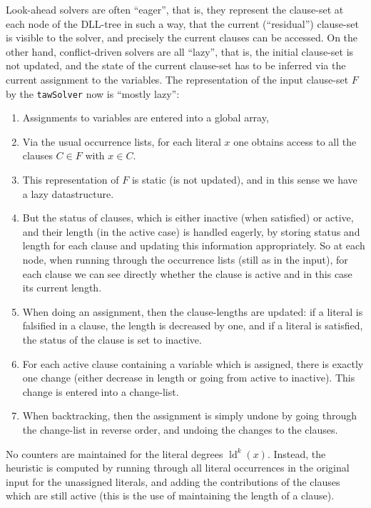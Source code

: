 \documentclass[final,3p,times]{elsarticle}
\theoremstyle{definition}
\newcommand{\tawsolver}{\texttt{tawSolver}}
\DeclareMathOperator{\ldeg}{ld} %
\begin{document}
Look-ahead solvers are often ``eager'', that is, they represent the clause-set at each node of the DLL-tree in such a way, that the current (``residual'') clause-set is visible to the solver, and precisely the current clauses can be accessed. On the other hand, conflict-driven solvers are all ``lazy'', that is, the initial clause-set is not updated, and the state of the current clause-set has to be inferred via the current assignment to the variables. The representation of the input clause-set $F$ by the \tawsolver{} now is ``mostly lazy'':
\begin{enumerate}
\item Assignments to variables are entered into a global array,
\item Via the usual occurrence lists, for each literal $x$ one obtains access to all the clauses  $C \in F$ with $x \in C$.
\item This representation of $F$ is static (is not updated), and in this sense we have a lazy datastructure.
\item But the status of clauses, which is either inactive (when satisfied) or active, and their length (in the active case) is handled eagerly, by storing status and length for each clause and updating this information appropriately. So at each node, when running through the occurrence lists (still as in the input), for each clause we can see directly whether the clause is active and in this case its current length.
\item When doing an assignment, then the clause-lengths are updated: if a literal is falsified in a clause, the length is decreased by one, and if a literal is satisfied, the status of the clause is set to inactive.
\item For each active clause containing a variable which is assigned, there is exactly one change (either decrease in length or going from active to inactive). This change is entered into a change-list.
\item When backtracking, then the assignment is simply undone by going through the change-list in reverse order, and undoing the changes to the clauses.
\end{enumerate}

No counters are maintained for the literal degrees $\ldeg^k(x)$. Instead, the heuristic is computed by running through all literal occurrences in the original input for the unassigned literals, and adding the contributions of the clauses which are still active (this is the use of maintaining the length of a clause).
\end{document}
